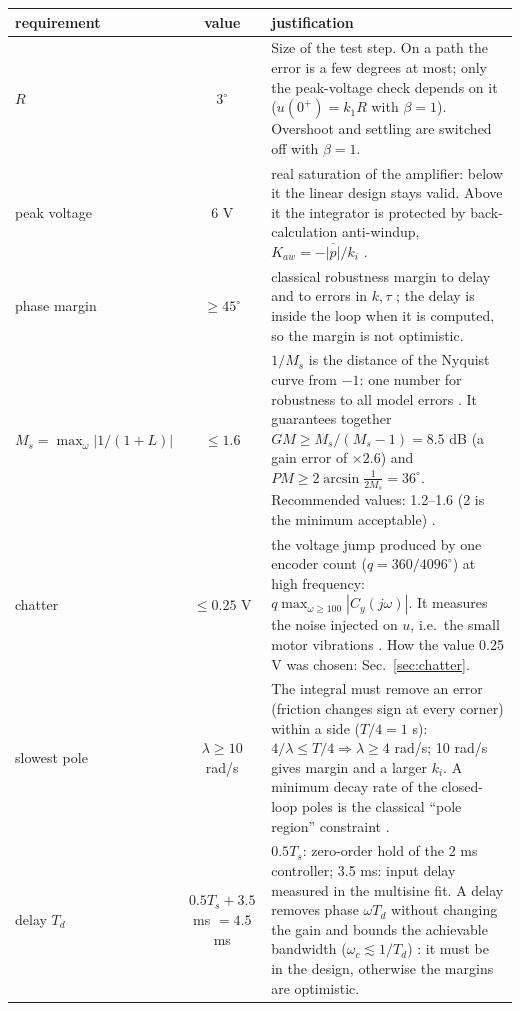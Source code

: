 \documentclass[10pt,a4paper]{article}
\begin{document}
\begin{tabularx}{\linewidth}{@{}l c X@{}}
\toprule
requirement & value & justification \\
\midrule
$R$ & 3$^\circ$ &
  Size of the test step. On a path the error is a few degrees at most; only the peak-voltage check depends on it
  ($u(0^+)=k_1R$ with $\beta=1$). Overshoot and settling are switched off with $\beta=1$. \\
peak voltage & 6 V & real saturation of the amplifier: below it the linear design stays valid. Above it the integrator
  is protected by back-calculation anti-windup, $K_{aw}=-\overline{|p|}/k_i$ \cite{AstromRundqwist1989,AstromHagglund2006}. \\
phase margin & $\geq45^\circ$ & classical robustness margin to delay and to errors in $k,\tau$ \cite{Franklin2019,AstromMurray2021};
  the delay is inside the loop when it is computed, so the margin is not optimistic. \\
$M_s=\max_\omega|1/(1+L)|$ & $\leq1.6$ &
  $1/M_s$ is the distance of the Nyquist curve from $-1$: one number for robustness to all model errors
  \cite{SkogestadPostlethwaite2005,AstromHagglund2006}. It guarantees together
  $GM\geq M_s/(M_s-1)=8.5$ dB (a gain error of $\times2.6$) and $PM\geq2\arcsin\frac{1}{2M_s}=36^\circ$.
  Recommended values: 1.2--1.6 (2 is the minimum acceptable) \cite{SkogestadPostlethwaite2005,AstromHagglund2006}. \\
chatter & $\leq0.25$ V &
  the voltage jump produced by one encoder count ($q=360/4096^\circ$) at high frequency:
  $q\max_{\omega\geq100}|C_y(j\omega)|$. It measures the noise injected on $u$, i.e.\ the small motor vibrations
  \cite{Garpinger2014,RomeroSegovia2014,AstromHagglund2006}. How the value 0.25 V was chosen: Sec.~\ref{sec:chatter}. \\
slowest pole & $\lambda\geq10$ rad/s &
  The integral must remove an error (friction changes sign at every corner) within a side ($T/4=1$ s):
  $4/\lambda\leq T/4\Rightarrow\lambda\geq4$ rad/s; 10 rad/s gives margin and a larger $k_i$. A minimum decay rate of
  the closed-loop poles is the classical ``pole region'' constraint \cite{ChilaliGahinet1996,Ackermann2002}. \\
delay $T_d$ & $0.5T_s+3.5$ ms $=4.5$ ms &
  $0.5T_s$: zero-order hold of the 2 ms controller; 3.5 ms: input delay measured in the multisine fit. A delay removes
  phase $\omega T_d$ without changing the gain and bounds the achievable bandwidth ($\omega_c\lesssim1/T_d$)
  \cite{Skogestad2003,SkogestadPostlethwaite2005}: it must be in the design, otherwise the margins are optimistic. \\
\bottomrule
\end{tabularx}
\end{document}
